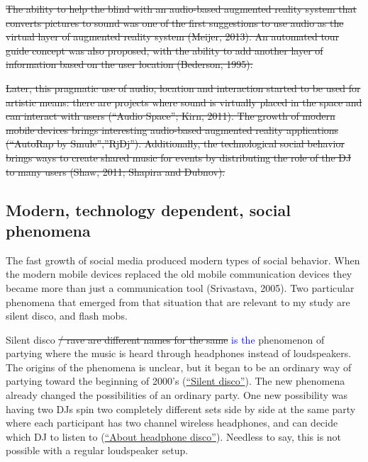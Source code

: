 \documentclass[a4paper,11pt]{article}
\newcommand{\new}[1]{\textcolor{blue}{#1}}
\begin{document}
\st{The ability to help the blind with an audio-based augmented reality system that converts pictures to sound was one of the first suggestions to use audio as the virtual layer of augmented reality system (Meijer, 2013). An automated tour guide concept was also proposed, with the ability to add another layer of information based on the user location (Bederson, 1995).}

\st{Later, this pragmatic use of audio, location and interaction started to be used for artistic means: there are projects where sound is virtually placed in the space and can interact with users (``Audio Space''; Kirn, 2011). The growth of modern mobile devices brings interesting audio-based augmented reality applications (``AutoRap by Smule'',''RjDj''). Additionally, the technological social behavior brings ways to create shared music for events by distributing the role of the DJ to many users (Shaw, 2011; Shapira and Dubnov).}

\subsection{Modern, technology dependent, social phenomena}


The fast growth of social media produced modern types of social behavior. When the modern mobile devices replaced the old mobile communication devices they became more than just a communication tool (Srivastava, 2005). Two particular phenomena that emerged from that situation that are relevant to my study are silent disco, and flash mobs.

Silent disco \st{/ rave are different names for the same} \new{is the} phenomenon of partying where the music is heard through headphones instead of loudspeakers. The origins of the phenomena is unclear, but it began to be an ordinary way of partying toward the beginning of 2000's (\href{http://en.wikipedia.org/wiki/Silent_disco}{``Silent disco''}). The new phenomena already changed the possibilities of an ordinary party. One new possibility was having two DJs spin two completely different sets side by side at the same party where each participant has two channel wireless headphones, and can decide which DJ to listen to (\href{http://headphonedisco.com/about.php}{``About headphone disco''}). Needless to say, this is not possible with a regular loudspeaker setup.
\end{document}
